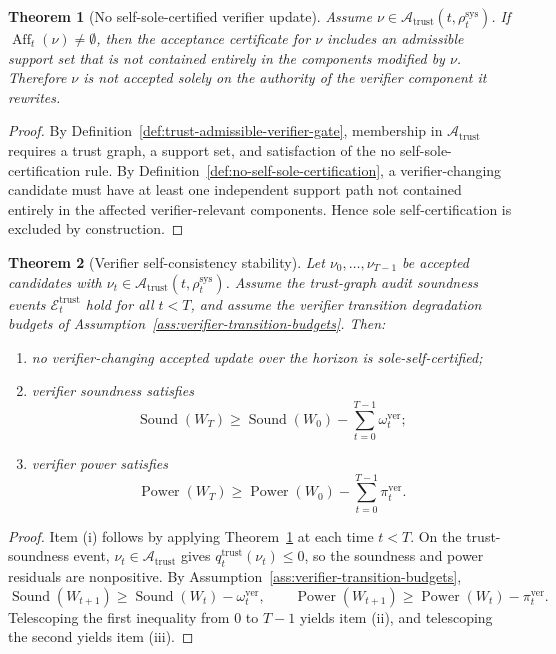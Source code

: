 \documentclass[11pt,a4paper]{article}
\newtheorem{theorem}{Theorem}[section]
\newcommand{\Acal}{\mathcal A}
\newcommand{\Ecal}{\mathcal E}
\newcommand{\sys}{\mathrm{sys}}
\newcommand{\Sound}{\operatorname{Sound}}
\newcommand{\Power}{\operatorname{Power}}
\newcommand{\ver}{\mathrm{ver}}
\newcommand{\trust}{\mathrm{trust}}
\begin{document}
\begin{theorem}[No self-sole-certified verifier update]
\label{thm:no-self-sole-certified-verifier-update}
Assume \(\nu\in\Acal_{\trust}(t,\rho_t^{\sys})\).  If \(\operatorname{Aff}_t(\nu)\neq\emptyset\), then the acceptance certificate for \(\nu\) includes an admissible support set that is not contained entirely in the components modified by \(\nu\).  Therefore \(\nu\) is not accepted solely on the authority of the verifier component it rewrites.
\end{theorem}

\begin{proof}
By Definition~\ref{def:trust-admissible-verifier-gate}, membership in \(\Acal_{\trust}\) requires a trust graph, a support set, and satisfaction of the no self-sole-certification rule.  By Definition~\ref{def:no-self-sole-certification}, a verifier-changing candidate must have at least one independent support path not contained entirely in the affected verifier-relevant components.  Hence sole self-certification is excluded by construction.
\end{proof}

\begin{theorem}[Verifier self-consistency stability]
\label{thm:verifier-self-consistency-stability}
Let \(\nu_0,\ldots,\nu_{T-1}\) be accepted candidates with \(\nu_t\in\Acal_{\trust}(t,\rho_t^{\sys})\).  Assume the trust-graph audit soundness events \(\Ecal_t^{\trust}\) hold for all \(t<T\), and assume the verifier transition degradation budgets of Assumption~\ref{ass:verifier-transition-budgets}.  Then:
\begin{enumerate}[label=(\roman*),leftmargin=1.5em]
    \item no verifier-changing accepted update over the horizon is sole-self-certified;
    \item verifier soundness satisfies
    \[
    \Sound(W_T)\ge \Sound(W_0)-\sum_{t=0}^{T-1}\omega_t^{\ver};
    \]
    \item verifier power satisfies
    \[
    \Power(W_T)\ge \Power(W_0)-\sum_{t=0}^{T-1}\pi_t^{\ver}.
    \]
\end{enumerate}
\end{theorem}

\begin{proof}
Item (i) follows by applying Theorem~\ref{thm:no-self-sole-certified-verifier-update} at each time \(t<T\).  On the trust-soundness event, \(\nu_t\in\Acal_{\trust}\) gives \(q_t^{\trust}(\nu_t)\le0\), so the soundness and power residuals are nonpositive.  By Assumption~\ref{ass:verifier-transition-budgets},
\[
\Sound(W_{t+1})\ge \Sound(W_t)-\omega_t^{\ver},
\qquad
\Power(W_{t+1})\ge \Power(W_t)-\pi_t^{\ver}.
\]
Telescoping the first inequality from \(0\) to \(T-1\) yields item (ii), and telescoping the second yields item (iii).
\end{proof}
\end{document}
